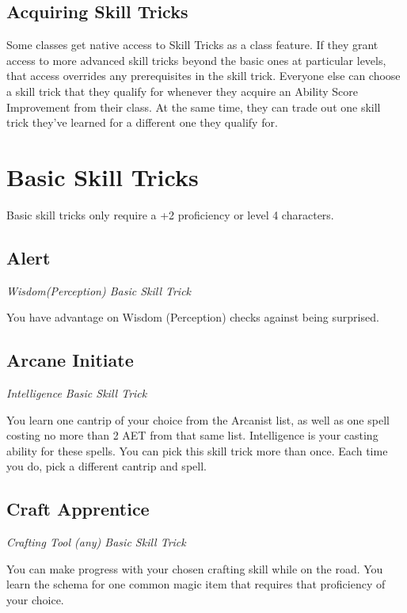 \subsection{Acquiring Skill Tricks}
\label{subsec:acquiring-skill-tricks}

Some classes get native access to Skill Tricks as a class feature. If they grant access to more advanced skill tricks beyond the basic ones at particular levels, that access overrides any prerequisites in the skill trick. Everyone else can choose a skill trick that they qualify for whenever they acquire an Ability Score Improvement from their class. At the same time, they can trade out one skill trick they've learned for a different one they qualify for.

\section{Basic Skill Tricks}
\label{sec:skill-tricks-basic}

Basic skill tricks only require a +2 proficiency or level 4 characters.

\subsection{Alert}\label{st:alert}

\textit{Wisdom(Perception) Basic Skill Trick}

You have advantage on Wisdom (Perception) checks against being surprised.

\subsection{Arcane Initiate}

\textit{Intelligence Basic Skill Trick}

You learn one cantrip of your choice from the Arcanist list, as well as one spell costing no more than 2 AET from that same list. Intelligence is your casting ability for these spells. You can pick this skill trick more than once. Each time you do, pick a different cantrip and spell.

\subsection{Craft Apprentice}\label{st:craft-apprentice}

\textit{Crafting Tool (any) Basic Skill Trick}

You can make progress with your chosen crafting skill while on the road. You learn the schema for one common magic item that requires that proficiency of your choice.

